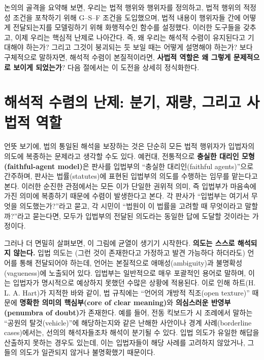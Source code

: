 \documentclass[12pt,a4paper]{article}
\begin{document}
논의의 골격을 요약해 보면, 우리는 법적 행위와 행위자를 정의하고, 법적
행위의 적정성 조건을 포착하기 위해 G--S--F 조건을 도입했으며, 법적
내용이 행위자들 간에 어떻게 전달되는지를 모델링하기 위해 화행적수인
함수를 설정했다. 이러한 도구들을 갖추고, 이제 우리는 핵심적 난제로
나아간다. 즉, 왜 우리는 해석적 수렴이 유지된다고 기대해야 하는가? 그리고
그것이 붕괴되는 듯 보일 때는 어떻게 설명해야 하는가? 보다 구체적으로
말하자면, 해석적 수렴이 본질적이라면, \textbf{사법적 역할은 왜 그렇게
문제적으로 보이게 되었는가}? 다음 절에서는 이 도전을 상세히 정식화한다.

\section{해석적 수렴의 난제: 분기, 재량, 그리고 사법적
역할}

언뜻 보기에, 법의 통일된 해석을 보장하는 것은 단순히 모든 법적 행위자가
입법자의 의도에 복종하는 문제라고 생각할 수도 있다. 예컨대, 전통적으로
\textbf{충실한 대리인 모형(faithful-agent model)}은 판사를 입법부의
``충실한 대리인(faithful agents)''으로 간주하며, 판사는 법률(statutes)에
표현된 입법부의 의도를 수행하는 임무를 맡는다고
본다\autocite{bruhl2012elected,ross2013reconsidering}. 이러한 순진한
관점에서는 모든 이가 단일한 권위적 의미, 즉 입법부가 마음속에 가진
의미에 복종하기 때문에 수렴이 발생한다고 본다. 각 판사가 ``입법부는
여기서 무엇을 의도했는가?''라고 묻고, 각 시민이 ``법원이 이 법률을
고려할 때 무엇이라고 말할까?''라고 묻는다면, 모두가 입법부의 전달된
의도라는 동일한 답에 도달할 것이라는 가정이다.

그러나 더 면밀히 살펴보면, 이 그림에 균열이 생기기 시작한다.
\textbf{의도는 스스로 해석되지 않는다.} 입법 의도는 (그런 것이
존재한다고 가정하고 발견 가능하다 하더라도) 언어를 통해 전달되어야
하는데, 언어는 본질적으로 애매성(ambiguity)과 불명확성(vagueness)에
노출되어 있다. 입법부는 일반적으로 매우 포괄적인 용어로 말하며, 이는
입법자가 명시적으로 예상하지 못했던 수많은 상황에 적용된다. 이로 인해
하트(H. L. A. Hart)가 지적한 바와 같이, 법 규칙에는 ``언어의 개방적
직조(open texture)'' 때문에 \textbf{명확한 의미의 핵심부(core of clear
meaning)}와 \textbf{의심스러운 반영부(penumbra of doubt)}가
존재한다\autocite{hart1994concept}. 예를 들어, 전동 킥보드가 시 조례에서
말하는 ``공원의 탈것(vehicle)''에 해당하는지와 같은 난해한 사안이나 경계
사례(borderline cases)에서는, 선의의 해석자들조차 해석이 분기될 수 있다.
입법 의도가 유일한 해답을 산출하지 못하는 경우도 있는데, 이는 입법자들이
해당 사례를 고려하지 않았거나, 그들의 의도가 일관되지 않거나 불명확했기
때문이다.
\end{document}
